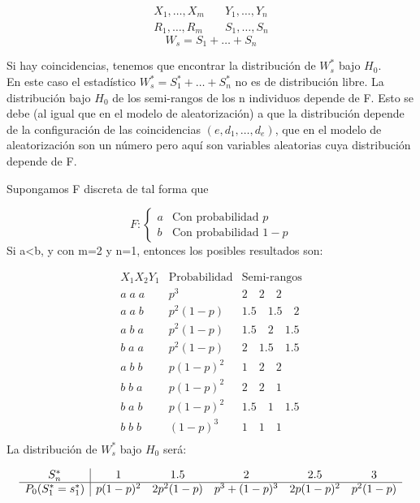 $$
\begin{aligned}
    X_1,\dots, X_m & \quad Y_1,\dots,Y_n\\
    R_1,\dots, R_m & \quad S_1,\dots,S_n
\end{aligned}
$$
$$
W_s=S_1+\dots+S_n
$$

Si hay coincidencias, tenemos que encontrar la distribución de $W^*_s$ bajo $H_0$. \\
En este caso el estadístico $W^*_s=S^*_1+\dots+S^*_n$ no es de distribución libre. La distribución bajo $H_0$ de los semi-rangos de los n individuos depende de F. 
Esto se debe (al igual que en el modelo de aleatorización) a que la distribución depende de la configuración de las coincidencias $(e,d_1,\dots,d_e)$, que en el modelo de aleatorización son un número pero aquí son variables aleatorias cuya distribución depende de F.

\begin{theorem}
    Supongamos F discreta de tal forma que 
    
    $$
        F:\begin{cases}
            a & \text{Con probabilidad } p \\
            b & \text{Con probabilidad } 1-p
        \end{cases}
    $$
    Si a<b, y con m=2 y n=1, entonces los posibles resultados son:

    $$
    \begin{array}{c|c|c}
        X_1X_2Y_1 & \text{Probabilidad} & \text{Semi-rangos} \\ \hline
        a \; a \; a & p^3 & 2 \quad 2 \quad 2 \\ 
        a \; a \; b & p^2(1-p) & 1.5 \quad 1.5 \quad 2 \\ 
        a \; b \; a & p^2(1-p) & 1.5 \quad 2 \quad 1.5 \\ 
        b \; a \; a & p^2(1-p) & 2 \quad 1.5 \quad 1.5 \\ 
        a \; b \; b & p(1-p)^2 & 1 \quad 2 \quad 2 \\ 
        b \; b \; a & p(1-p)^2 & 2 \quad 2 \quad 1 \\ 
        b \; a \; b & p(1-p)^2 & 1.5 \quad 1 \quad 1.5 \\ 
        b \; b \; b & (1-p)^3 & 1 \quad 1 \quad 1 \\ 
    \end{array}
    $$
    La distribución de $W^*_s$ bajo $H_0$ será:

    $$
    \begin{array}{c|c c c c c}
        S^*_n & 1 & 1.5 & 2 & 2.5 & 3 \\ \hline 
        P_0(S^*_1=s^*_1) & p(1-p)^2 & 2p^2(1-p) & p^3+(1-p)^3 & 2p(1-p)^2 & p^2(1-p) \\
    \end{array}
    $$

\end{theorem}


